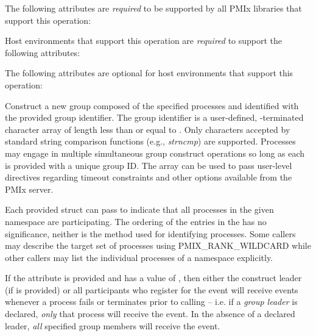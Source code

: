\returnsimple

\reqattrstart
The following attributes are \textit{required} to be supported by all \ac{PMIx} libraries that support this operation:


Host environments that support this operation are \textit{required} to support the following attributes:


\reqattrend

\optattrstart
The following attributes are optional for host environments that support this operation:


\optattrend

\descr

Construct a new group composed of the specified processes and identified with the provided group identifier. The group identifier is a user-defined, -terminated character array of length less than or equal to . Only characters accepted by standard string comparison functions (e.g., \emph{strncmp}) are supported. Processes may engage in multiple simultaneous group construct operations so long as each is provided with a unique group ID. The  array can be used to pass user-level directives regarding timeout constraints and other options available from the \ac{PMIx} server.

Each provided  struct can pass  to indicate that all processes in the given namespace are participating.
The ordering of the entries in the  has no significance, neither is the method used for identifying processes.
Some callers may describe the target set of processes using PMIX_RANK_WILDCARD while other 
callers may list the individual processes of a namespace explicitly.

If the  attribute is provided and has a value of , then either the construct leader (if  is provided) or all participants who register for the  event will receive events whenever a process fails or terminates prior to calling  – i.e. if a \emph{group leader} is declared, \textit{only} that process will receive the event. In the absence of a declared leader, \textit{all} specified group members will receive the event.

